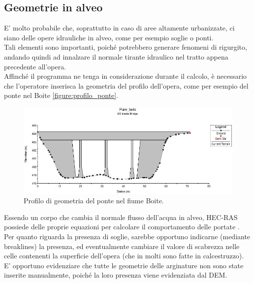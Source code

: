 \subsection{Geometrie in alveo}
E' molto probabile che, soprattutto in caso di aree altamente urbanizzate, ci siano delle opere idrauliche in alveo, come per esempio soglie o ponti.\\
Tali elementi sono importanti, poiché potrebbero generare fenomeni di rigurgito, andando quindi ad innalzare il normale tirante idraulico nel tratto appena precedente all'opera.\\
Affinché il programma ne tenga in considerazione durante il calcolo, è necessario che l'operatore inserisca la geometria del profilo dell'opera, come per esempio del ponte nel Boite \eqref{figure:profilo_ponte}. 
\begin{figure}[htb] \centering
    \includegraphics[scale=0.6]{immagini/profilo_ponte.JPG}
    \caption{Profilo di geometria del ponte nel fiume Boite.}
    \label{figure:profilo_ponte}
\end{figure}
Essendo un corpo che cambia il normale flusso dell'acqua in alveo, HEC-RAS possiede delle proprie equazioni per calcolare il comportamento delle portate \cite{modeling_bridges}.\\
Per quanto riguarda la presenza di soglie, sarebbe opportuno indicarne (mediante breaklines) la presenza, ed eventualmente cambiare il valore di scabrezza nelle celle contenenti la superficie dell'opera (che in molti sono fatte in calcestruzzo).\\
E' opportuno evidenziare che tutte le geometrie delle arginature non sono state inserite manualmente, poiché la loro presenza viene evidenziata dal DEM.

